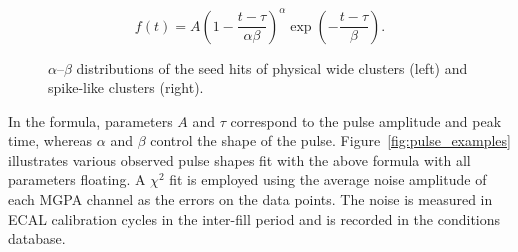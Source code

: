 \begin{equation}
  \label{eqn:pulse_shape}
  f(t) = A \left(1 - \frac{t - \tau}{\alpha\beta}\right)^{\alpha} \exp \left(-\frac{t-\tau}{\beta}\right).
\end{equation}

\begin{figure}[htbp]
  \centering
  \caption{
    $\alpha$--$\beta$ distributions of the seed hits of physical wide clusters (left) and spike-like clusters (right).
  }
  \label{fig:spike_alphabeta}
\end{figure}

In the formula, parameters $A$ and $\tau$ correspond to the pulse amplitude and peak time, whereas $\alpha$ and $\beta$ control the shape of the pulse. 
Figure~\ref{fig:pulse_examples} illustrates various observed pulse shapes fit with the above formula with all parameters floating. 
A $\chi^{2}$ fit is employed using the average noise amplitude of each MGPA channel as the errors on the data points. 
The noise is measured in ECAL calibration cycles in the inter-fill period and is recorded in the conditions database.

